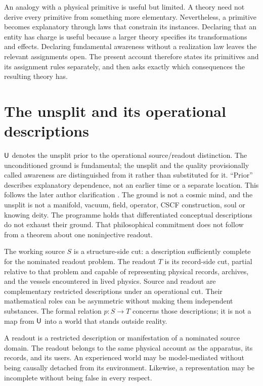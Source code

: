 An analogy with a physical primitive is useful but limited. A theory need not derive every primitive from something more elementary. Nevertheless, a primitive becomes explanatory through laws that constrain its instances. Declaring that an entity has charge is useful because a larger theory specifies its transformations and effects. Declaring fundamental awareness without a realization law leaves the relevant assignments open. The present account therefore states its primitives and its assignment rules separately, and then asks exactly which consequences the resulting theory has.

\section{The unsplit and its operational descriptions}\label{section:problem:one-reality-multiple-descriptions}
$\mathsf{U}$ denotes the unsplit prior to the operational source/readout distinction. The unconditioned ground is fundamental; the unsplit and the quality provisionally called awareness are distinguished from it rather than substituted for it. ``Prior'' describes explanatory dependence, not an earlier time or a separate location. This follows the later author clarification \cite{RodgersClarification2026}. The ground is not a cosmic mind, and the unsplit is not a manifold, vacuum, field, operator, CSCF construction, soul or knowing deity. The programme holds that differentiated conceptual descriptions do not exhaust their ground. That philosophical commitment does not follow from a theorem about one noninjective readout.

The working source $S$ is a structure-side cut: a description sufficiently complete for the nominated readout problem. The readout $T$ is its record-side cut, partial relative to that problem and capable of representing physical records, archives, and the vessels encountered in lived physics. Source and readout are complementary restricted descriptions under an operational cut. Their mathematical roles can be asymmetric without making them independent substances. The formal relation $p:S\to T$ concerns those descriptions; it is not a map from $\mathsf{U}$ into a world that stands outside reality.

A readout is a restricted description or manifestation of a nominated source domain. The readout belongs to the same physical account as the apparatus, its records, and its users. An experienced world may be model-mediated without being causally detached from its environment. Likewise, a representation may be incomplete without being false in every respect.

